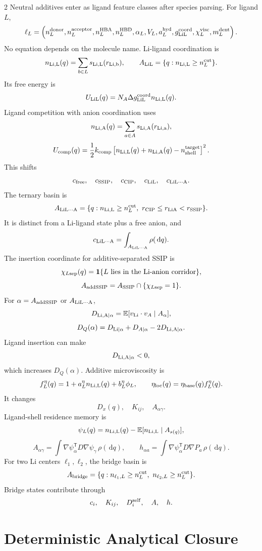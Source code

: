 \documentclass[10pt]{article}
\newcommand{\dd}{\,\mathrm d}
\newcommand{\T}{\mathsf{T}}
\begin{document}
\begin{multicols}{2}
Neutral additives enter as ligand feature classes after species parsing. For
ligand \(L\),
\[
\ell_L=
\left(
n_L^{\rm donor},
n_L^{\rm acceptor},
n_L^{\rm HBA},
n_L^{\rm HBD},
\alpha_L,
V_L,
a_L^{\rm hyd},
g_{\rm LiL}^{\rm coord},
\chi_L^{\rm visc},
m_L^{\rm dent}
\right).
\]
No equation depends on the molecule name. Li-ligand coordination is
\[
n_{\rm Li,L}(q)=\sum_{b\in L}s_{\rm Li,L}(r_{\rm Li,b}),
\qquad
A_{\rm LiL}=\{q:n_{\rm Li,L}\ge n_L^{\rm cut}\}.
\]
Its free energy is
\[
U_{\rm LiL}(q)=N_A\Delta g_{\rm LiL}^{\rm coord}n_{\rm Li,L}(q).
\]
Ligand competition with anion coordination uses
\[
n_{\rm Li,A}(q)=\sum_{a\in A}s_{\rm Li,A}(r_{\rm Li,a}),
\]
\[
U_{\rm comp}(q)
=
\frac12k_{\rm comp}
\left[
n_{\rm Li,L}(q)+n_{\rm Li,A}(q)-n_{\rm shell}^{\rm target}
\right]^2.
\]
This shifts
\[
c_{\rm free},\quad c_{\rm SSIP},\quad c_{\rm CIP},\quad
c_{\rm LiL},\quad c_{\rm LiL\cdots A}.
\]
The ternary basin is
\[
A_{\rm LiL\cdots A}
=
\{q:n_{\rm Li,L}\ge n_L^{\rm cut},\
r_{\rm CIP}\le r_{\rm LiA}<r_{\rm SSIP}\}.
\]
It is distinct from a Li-ligand state plus a free anion, and
\[
c_{\rm LiL\cdots A}
=
\int_{A_{\rm LiL\cdots A}}\rho(\dd q).
\]
The insertion coordinate for additive-separated SSIP is
\[
\chi_{L{\rm sep}}(q)
=
\mathbf 1\{L\ {\rm lies\ in\ the\ Li\text{-}anion\ corridor}\},
\]
\[
A_{\rm addSSIP}=A_{\rm SSIP}\cap\{\chi_{L{\rm sep}}=1\}.
\]
For \(\alpha=A_{\rm addSSIP}\) or \(A_{\rm LiL\cdots A}\),
\[
D_{\rm Li,A|\alpha}
=
\mathbb E[v_{\rm Li}\cdot v_A\mid A_\alpha],
\]
\[
D_Q(\alpha)
=
D_{\rm Li|\alpha}+D_{A|\alpha}-2D_{\rm Li,A|\alpha}.
\]
Ligand insertion can make
\[
D_{\rm Li,A|\alpha}<0,
\]
which increases \(D_Q(\alpha)\). Additive microviscosity is
\[
f_L^\eta(q)=1+a_L^\eta n_{\rm Li,L}(q)+b_L^\eta\phi_L,
\qquad
\eta_{\rm loc}(q)=\eta_{\rm base}(q)f_L^\eta(q).
\]
It changes
\[
D_x(q),\quad K_{ij},\quad A_{\alpha\gamma}.
\]
Ligand-shell residence memory is
\[
\psi_L(q)
=
n_{\rm Li,L}(q)-\mathbb E[n_{\rm Li,L}\mid A_{s(q)}],
\]
\[
A_{\alpha\gamma}
=
\int\nabla\psi_\alpha^\T D\nabla\psi_\gamma\,\rho(\dd q),
\qquad
h_{\alpha a}
=
\int\nabla\psi_\alpha^\T D\nabla P_a\,\rho(\dd q).
\]
For two Li centers \(\ell_1,\ell_2\), the bridge basin is
\[
A_{\rm bridge}
=
\{q:n_{\ell_1,L}\ge n_L^{\rm cut},\
n_{\ell_2,L}\ge n_L^{\rm cut}\}.
\]
Bridge states contribute through
\[
c_i,\quad K_{ij},\quad D_i^{\rm self},\quad A,\quad h.
\]

\section{Deterministic Analytical Closure}


\end{multicols}
\end{document}
